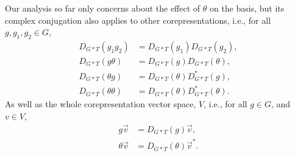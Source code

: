 \documentclass[preprint, 12pt]{revtex4-2}
\numberwithin{equation}{section}
\begin{document}
Our analysis so far only concerns about the effect of $\theta$ on the basis, but its complex conjugation also applies to other corepresentations, i.e., for all $g, g_1, g_2\in G$,
\begin{equation}
    \begin{aligned}
        D_{G\ast T}(g_1g_2) &= D_{G\ast T}(g_1)D_{G\ast T}(g_2), \\
        D_{G\ast T}(g\theta) &= D_{G\ast T}(g)D_{G\ast T}(\theta), \\
        D_{G\ast T}(\theta g) &= D_{G\ast T}(\theta)D_{G\ast T}^\ast(g), \\
        D_{G\ast T}(\theta\theta) &= D_{G\ast T}(\theta)D_{G\ast T}^\ast(\theta).
    \end{aligned}
\end{equation}
As well as the whole corepresentation vector space, $V$, i.e., for all $g\in G$, and $v\in V$,
\begin{equation}
    \begin{aligned}
        g\vec{v} &= D_{G\ast T}(g)\vec{v}, \\
        \theta\vec{v} &= D_{G\ast T}(\theta)\vec{v}^\ast.
    \end{aligned}
\end{equation}
\end{document}
